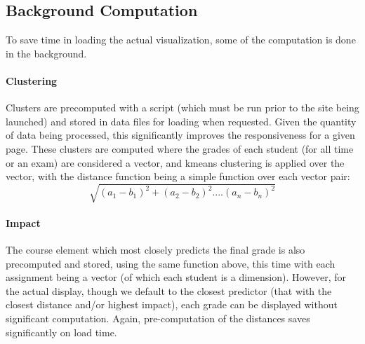 \subsection{Background Computation}
To save time in loading the actual visualization, some of the computation is done in the background. 

\paragraph{Clustering}
Clusters are precomputed with a script (which must be run prior to the site being launched) and stored in data files for loading 
when requested. Given the quantity of data being processed, this significantly improves the responsiveness for a given page. 
These clusters are computed where the grades of each student (for all time or an exam) are considered a vector, and kmeans 
clustering is applied over the vector, with the distance function being a simple function over each vector pair:
\[  \sqrt{ (a_1-b_1)^2 + (a_2-b_2)^2 .... (a_n-b_n)^2   }\]

\paragraph{Impact}
The course element which most closely predicts the final grade is also precomputed and stored, using the same function above, this time with each assignment being a vector (of which each student is a dimension). However, for the actual display, though we default to the closest predictor (that with the closest distance and/or highest impact), each grade can be displayed without significant computation. Again, pre-computation of the distances saves significantly on load time. 
